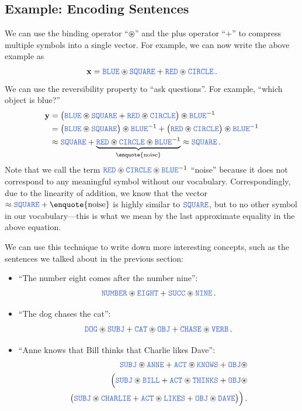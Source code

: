 \documentclass[10pt,letterpaper,oneside]{article}
\begin{document}
\subsection{Example: Encoding Sentences}
We can use the binding operator \enquote{$\circledast$} and the plus operator \enquote{$+$} to compress multiple symbols into a single vector. For example, we can now write the above example as
\begin{align*}
	\vec x = \Obj{BLUE} \CC \Obj{SQUARE} + \Obj{RED} \CC \Obj{CIRCLE} \,.
\end{align*}
We can use the reversibility property to \enquote{ask questions}. For example, \enquote{which object is blue?}
\begin{align*}
	\vec y &= \big( \Obj{BLUE} \CC \Obj{SQUARE} + \Obj{RED} \CC \Obj{CIRCLE} \big) \CC \Obj{BLUE}^{-1} \\
		   &= \big( \Obj{BLUE} \CC \Obj{SQUARE} \big) \CC \Obj{BLUE}^{-1} + \big( \Obj{RED} \CC \Obj{CIRCLE} \big) \CC \Obj{BLUE}^{-1} \\
		   &\approx \Obj{SQUARE} + \underbrace{\Obj{RED} \CC \Obj{CIRCLE} \CC \Obj{BLUE}^{-1}}_{\text{\enquote{noise}}} 
		    \approx \Obj{SQUARE} \,.
\end{align*}
Note that we call the term $\Obj{RED} \CC \Obj{CIRCLE} \CC \Obj{BLUE}^{-1}$ \enquote{noise} because it does not correspond to any meaningful symbol without our vocabulary. Correspondingly, due to the linearity of addition, we know that the vector $\approx \Obj{SQUARE} + \text{\enquote{noise}}$ is highly similar to $\Obj{SQUARE}$, but to no other symbol in our vocabulary---this is what we mean by the last approximate equality in the above equation.

We can use this technique to write down more interesting concepts, such as the sentences we talked about in the previous section:
\begin{itemize}
	\item \enquote{The number eight comes after the number nine}:
	\begin{align*}
		\Obj{NUMBER} \CC \Obj{EIGHT} + \Obj{SUCC} \CC \Obj{NINE} \,.
	\end{align*}
	\item \enquote{The dog chases the cat}:
	\begin{align*}
		\Obj{DOG} \CC \Obj{SUBJ} + \Obj{CAT} \CC \Obj{OBJ} + \Obj{CHASE} \CC \Obj{VERB} \,.
	\end{align*}
	\item \enquote{Anne knows that Bill thinks that Charlie likes Dave}:
	\begin{align*}
	 	\Obj{SUBJ} \CC \Obj{ANNE} + \Obj{ACT} \CC \Obj{KNOWS} + \Obj{OBJ} \CC \\\Big(\Obj{SUBJ} \CC \Obj{BILL} + \Obj{ACT} \CC \Obj{THINKS} + \Obj{OBJ} \CC \\ \big(\Obj{SUBJ} \CC \Obj{CHARLIE} + \Obj{ACT} \CC \Obj{LIKES} + \Obj{OBJ} \CC \Obj{DAVE}\big)\Big) \,.
	\end{align*}
\end{itemize}
\end{document}
